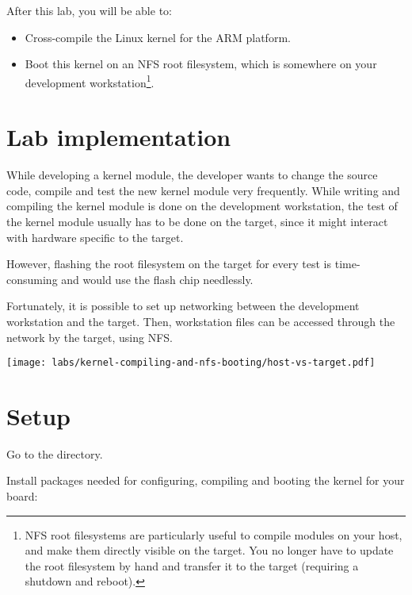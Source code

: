 
After this lab, you will be able to:
\begin{itemize}

\item Cross-compile the Linux kernel for the ARM platform.

\item Boot this kernel on an NFS root filesystem, which is somewhere
on your development workstation\footnote{NFS root filesystems are
particularly useful to compile modules on your host, and make them
directly visible on the target. You no longer have to update the root
filesystem by hand and transfer it to the target (requiring a shutdown
and reboot).}.

\end{itemize}

\section{Lab implementation}

While developing a kernel module, the developer wants to change the
source code, compile and test the new kernel module very
frequently. While writing and compiling the kernel module is done on the
development workstation, the test of the kernel module usually has to
be done on the target, since it might interact with hardware specific
to the target.

However, flashing the root filesystem on the target for every test is
time-consuming and would use the flash chip needlessly.

Fortunately, it is possible to set up networking between the
development workstation and the target. Then, workstation files can be
accessed through the network by the target, using NFS.

\begin{center}
\texttt{[image: labs/kernel-compiling-and-nfs-booting/host-vs-target.pdf]}
\end{center}

\section{Setup}

Go to the  directory.

Install packages needed for configuring, compiling and booting
the kernel for your board:

